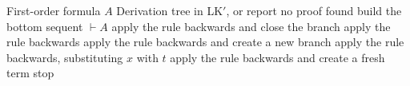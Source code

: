 \begin{algorithm}
  \caption{Na\"ive backward proof search for LK$'$ (Algorithm~2 of
  \cite[p.~67]{hou2021fundamentals})}\label{alg:naive}
  \begin{algorithmic}[1]
    \Require First-order formula $A$
    \Ensure Derivation tree in LK$'$, or report no proof found
    \State build the bottom sequent $\vdash A$
    \State apply the rule backwards and close the branch
    \State apply the rule backwards
    \State apply the rule backwards and create a new branch
    \State apply the rule backwards, substituting $x$ with $t$
    \State apply the rule backwards and create a fresh term
    \Else
    \State stop
    \EndIf
    \EndFor
  \end{algorithmic}
\end{algorithm}
